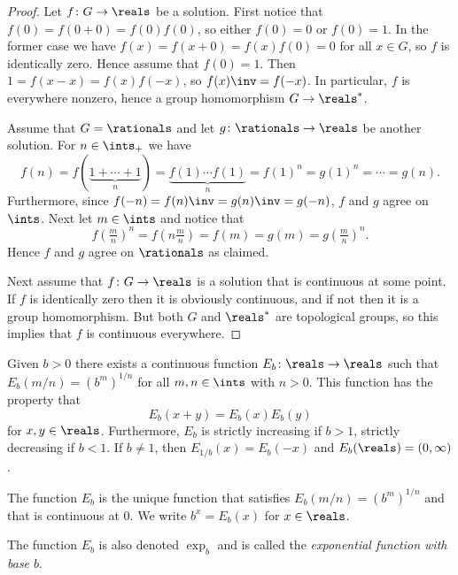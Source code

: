 \documentclass[article, a4paper, 11pt, oneside]{memoir}
\numberwithin{equation}{chapter}
\newcommand{\posints}{\ints_{+}}
\begin{document}
\begin{proof}
    Let $f \colon G \to \reals$ be a solution. First notice that $f(0) = f(0+0) = f(0)f(0)$, so either $f(0) = 0$ or $f(0) = 1$. In the former case we have $f(x) = f(x+0) = f(x)f(0) = 0$ for all $x \in G$, so $f$ is identically zero. Hence assume that $f(0) = 1$. Then $1 = f(x-x) = f(x)f(-x)$, so $f(x)\inv = f(-x)$. In particular, $f$ is everywhere nonzero, hence a group homomorphism $G \to \reals^*$.
    
    Assume that $G = \rationals$ and let $g \colon \rationals \to \reals$ be another solution. For $n \in \posints$ we have
    \begin{equation*}
        f(n)
            = f(\underbrace{1 + \cdots + 1}_{n})
            = \underbrace{f(1) \cdots f(1)}_{n}
            = f(1)^n
            = g(1)^n
            = \cdots
            = g(n).
    \end{equation*}
    Furthermore, since $f(-n) = f(n)\inv = g(n)\inv = g(-n)$, $f$ and $g$ agree on $\ints$. Next let $m \in \ints$ and notice that
    \begin{equation*}
        f(\tfrac{m}{n})^n
            = f(n \tfrac{m}{n})
            = f(m)
            = g(m)
            = g(\tfrac{m}{n})^n.
    \end{equation*}
    Hence $f$ and $g$ agree on $\rationals$ as claimed.

    Next assume that $f \colon G \to \reals$ is a solution that is continuous at some point. If $f$ is identically zero then it is obviously continuous, and if not then it is a group homomorphism. But both $G$ and $\reals^*$ are topological groups, so this implies that $f$ is continuous everywhere.
\end{proof}


\begin{theorem}
    Given $b > 0$ there exists a continuous function $E_b \colon \reals \to \reals$ such that $E_b(m/n) = (b^m)^{1/n}$ for all $m,n \in \ints$ with $n > 0$. This function has the property that
    \begin{equation*}
        E_b(x+y) = E_b(x) E_b(y)
    \end{equation*}
    for $x,y \in \reals$. Furthermore, $E_b$ is strictly increasing if $b > 1$, strictly decreasing if $b < 1$. If $b \neq 1$, then $E_{1/b}(x) = E_b(-x)$ and $E_b(\reals) = (0,\infty)$.
    
    The function $E_b$ is the unique function that satisfies $E_b(m/n) = (b^m)^{1/n}$ and that is continuous at $0$. We write $b^x = E_b(x)$ for $x \in \reals$.
\end{theorem}
%
The function $E_b$ is also denoted $\exp_b$ and is called the \emph{exponential function with base $b$}.
\end{document}
